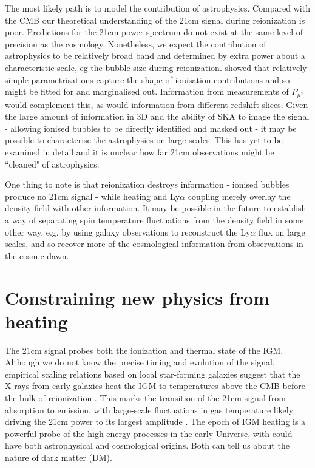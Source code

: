 \documentclass{PoS}
\begin{document}
The most likely path is to model the contribution of astrophysics. Compared with the CMB our theoretical understanding of the 21cm signal during reionization is poor. Predictions for the 21cm power spectrum do not exist at the same level of precision as the cosmology. Nonetheless, we expect the contribution of astrophysics to be relatively broad band and determined by extra power about a characteristic scale, eg the bubble size during reionization. \cite{2008PhRvD..78b3529M} showed that relatively simple parametrisations capture the shape of ionisation contributions and so might be fitted for and marginalised out. Information from measurements of $P_{\mu^2}$ would complement this, as would information from different redshift slices. Given the large amount of information in 3D and the ability of SKA to image the signal - allowing ionised bubbles to be directly identified and masked out - it may be possible to characterise the astrophysics on large scales. This has yet to be examined in detail and it is unclear how far 21cm observations might be ``cleaned" of astrophysics. 

One thing to note is that reionization destroys information - ionised bubbles produce no 21cm signal - while heating and Ly$\alpha$ coupling merely overlay the density field with other information. It may be possible in the future to establish a way of separating spin temperature fluctuations from the density field in some other way, e.g. by using galaxy observations to reconstruct the Ly$\alpha$ flux on large scales, and so recover more of the cosmological information from observations in the cosmic dawn.

\section{Constraining new physics from heating}
\label{sec:heating}

The 21cm signal probes both the ionization and thermal state of the IGM.  Although we do not know the precise timing and evolution of the signal, empirical scaling relations based on local star-forming galaxies \cite[e.g.][]{2012MNRAS.419.2095M} suggest that the X-rays from early galaxies heat the IGM to temperatures above the CMB before the bulk of reionization \cite[e.g.][]{2006MNRAS.371..867F,2012ApJ...760....3M}.  This marks the transition of the 21cm signal from absorption to emission, with large-scale fluctuations in gas temperature likely driving the 21cm power to its largest amplitude \cite[e.g.][]{2007MNRAS.376.1680P,2010A&A...523A...4B}.  The epoch of IGM heating is a powerful probe of the high-energy processes in the early Universe, with could have both astrophysical and cosmological origins.  Both can tell us about the nature of dark matter (DM).
\end{document}
